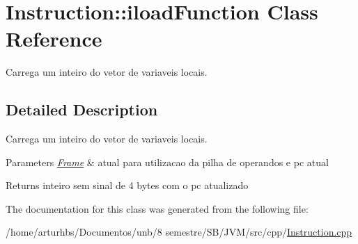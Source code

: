 \hypertarget{classInstruction_1_1iloadFunction}{}\section{Instruction\+:\+:iload\+Function Class Reference}
\label{classInstruction_1_1iloadFunction}


Carrega um inteiro do vetor de variaveis locais.  




\subsection{Detailed Description}
Carrega um inteiro do vetor de variaveis locais. 


\begin{DoxyParams}{Parameters}
{\em \hyperlink{classFrame}{Frame}} & atual para utilizacao da pilha de operandos e pc atual \\
\hline
\end{DoxyParams}
\begin{DoxyReturn}{Returns}
inteiro sem sinal de 4 bytes com o pc atualizado 
\end{DoxyReturn}


The documentation for this class was generated from the following file\+:\begin{DoxyCompactItemize}
\item 
/home/arturhbs/\+Documentos/unb/8 semestre/\+S\+B/\+J\+V\+M/src/cpp/\hyperlink{Instruction_8cpp}{Instruction.\+cpp}\end{DoxyCompactItemize}
